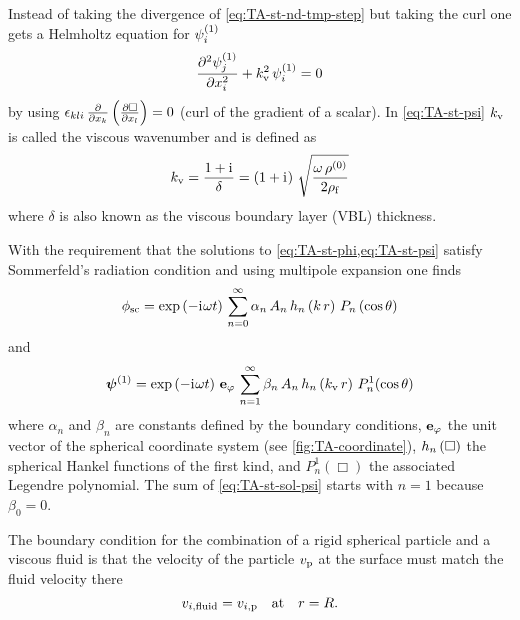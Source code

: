 Instead of taking the divergence of \cref{eq:TA-st-nd-tmp-step} but taking the 
curl one gets a Helmholtz equation for $\psi_{i}^{(1)}$
\begin{equation}
  \pdv[2]{  \psi_{j}^{(1)}  }{x_{i}} + k_{\mathrm{v}}^{2}\,\psi_{i}^{(1)} = 0
  \label{eq:TA-st-psi}
\end{equation}
by using $\epsilon_{kli}\,\pdv{x_{k}}\left( \pdv{\Box}{x_{l}} \right) = 0$ 
(curl of the gradient of a scalar). In \cref{eq:TA-st-psi} $k_{\mathrm{v}}$ is 
called the viscous wavenumber and is defined as
\begin{equation}
  k_{\mathrm{v}} = \frac{1 + \mathrm{i}\mkern1mu}{\delta} = \left( 1 + \mathrm{i}\mkern1mu \right)\, 
  \sqrt{\frac{\omega\,\rho^{(0)}}{2\rho_{\mathrm{f}}}}
  \label{eq:TA-st-visc-wavenumber}
\end{equation}
where $\delta$ is also known as the viscous boundary layer (VBL) thickness.

With the requirement that the solutions to \cref{eq:TA-st-phi,eq:TA-st-psi} 
satisfy Sommerfeld's radiation condition and using multipole expansion one 
finds
\begin{equation}
  \phi_{\mathrm{sc}} = \exp\left( -\mathrm{i}\mkern1mu\omega t \right)\,
  \sum\limits^{\infty}_{n=0} 
  \alpha_{n}\,A_{n}\,h_{n}\left(k\,r\right)\,P_{n}\left(\cos\theta\right)
  \label{eq:TA-st-sol-phi}
\end{equation}
and
\begin{equation}
  \vb*{\psi}^{(1)} = \exp\left( -\mathrm{i}\mkern1mu\omega t \right)\,\vb{e}_{\varphi}\,
  \sum\limits^{\infty}_{n=1} 
  \beta_{n}\,A_{n}\,h_{n}\left(k_{\mathrm{v}}\,r\right)\,P^{1}_{n}(\cos\theta)
  \label{eq:TA-st-sol-psi}
\end{equation}
where $\alpha_{n}$ and $\beta_{n}$ are constants defined by the boundary 
conditions, $\vb{e}_{\varphi}$ the unit vector of the spherical coordinate 
system (see \cref{fig:TA-coordinate}), $h_{n}\left(\Box\right)$ the spherical Hankel 
functions of the first kind, and $P^{1}_{n}\left( \Box \right)$ the associated 
Legendre polynomial. The sum of \cref{eq:TA-st-sol-psi} starts with $n=1$ 
because $\beta_{0}=0$.

The boundary condition for the combination of a rigid spherical particle and a 
viscous fluid is that the velocity of the particle $v_{\mathrm{p}}$ at the 
surface must match the fluid velocity there
\begin{equation}
  v_{i,\mathrm{fluid}} = v_{i,\mathrm{p}}\quad\text{at}\quad r = R.
  \label{eq:TA-st-BC}
\end{equation}

